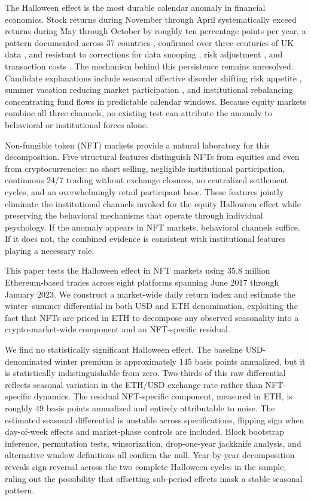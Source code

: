 \documentclass[12pt,a4paper]{article}
\begin{document}
The Halloween effect is the most durable calendar anomaly in financial economics. Stock returns during November through April systematically exceed returns during May through October by roughly ten percentage points per year, a pattern documented across 37 countries \citep{BoumanJacobsen2002}, confirmed over three centuries of UK data \citep{JacobsenZhang2013}, and resistant to corrections for data snooping \citep{HaggardWitte2010}, risk adjustment \citep{DichtlDrobetz2014}, and transaction costs \citep{AndradeChhaochhariaFuerst2013}. The mechanism behind this persistence remains unresolved. Candidate explanations include seasonal affective disorder shifting risk appetite \citep{KamstraKramerLevi2003}, summer vacation reducing market participation \citep{HongYu2009}, and institutional rebalancing concentrating fund flows in predictable calendar windows. Because equity markets combine all three channels, no existing test can attribute the anomaly to behavioral or institutional forces alone.

Non-fungible token (NFT) markets provide a natural laboratory for this decomposition. Five structural features distinguish NFTs from equities and even from cryptocurrencies: no short selling, negligible institutional participation, continuous 24/7 trading without exchange closures, no centralized settlement cycles, and an overwhelmingly retail participant base. These features jointly eliminate the institutional channels invoked for the equity Halloween effect while preserving the behavioral mechanisms that operate through individual psychology. If the anomaly appears in NFT markets, behavioral channels suffice. If it does not, the combined evidence is consistent with institutional features playing a necessary role.

This paper tests the Halloween effect in NFT markets using 35.8 million Ethereum-based trades across eight platforms spanning June 2017 through January 2023. We construct a market-wide daily return index and estimate the winter--summer differential in both USD and ETH denomination, exploiting the fact that NFTs are priced in ETH to decompose any observed seasonality into a crypto-market-wide component and an NFT-specific residual.

We find no statistically significant Halloween effect. The baseline USD-denominated winter premium is approximately 145 basis points annualized, but it is statistically indistinguishable from zero. Two-thirds of this raw differential reflects seasonal variation in the ETH/USD exchange rate rather than NFT-specific dynamics. The residual NFT-specific component, measured in ETH, is roughly 49 basis points annualized and entirely attributable to noise. The estimated seasonal differential is unstable across specifications, flipping sign when day-of-week effects and market-phase controls are included. Block bootstrap inference, permutation tests, winsorization, drop-one-year jackknife analysis, and alternative window definitions all confirm the null. Year-by-year decomposition reveals sign reversal across the two complete Halloween cycles in the sample, ruling out the possibility that offsetting sub-period effects mask a stable seasonal pattern.
\end{document}
